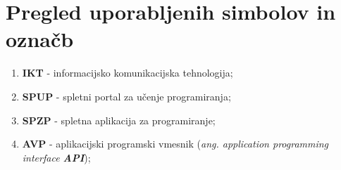 
\section*{Pregled uporabljenih simbolov in označb}
\label{sec:pregled_uporabljenih_simbolov_in_označb}

\begin{enumerate}[leftmargin=*]
\item \textbf{IKT} - informacijsko komunikacijska tehnologija;
\item \textbf{SPUP} - spletni portal za učenje programiranja;
\item \textbf{SPZP} - spletna aplikacija za programiranje;
\item \textbf{AVP} - aplikacijski programski vmesnik
  (\emph{ang. application programming interface \textbf{API}});
\end{enumerate}




